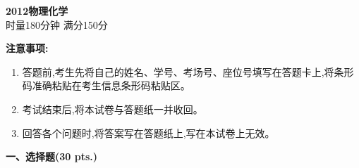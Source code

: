 \begin{center}
    {\LARGE \textbf{2012物理化学}} \\[2ex]
    {\large 时量180分钟 \quad 满分150分}
\end{center}

\vspace{0.5cm}
\noindent\textbf{注意事项:}
\begin{enumerate}[label=\arabic*., parsep=0pt, itemsep=0pt]
    \item 答题前,考生先将自己的姓名、学号、考场号、座位号填写在答题卡上,将条形码准确粘贴在考生信息条形码粘贴区。
    \item 考试结束后,将本试卷与答题纸一并收回。
    \item 回答各个问题时,将答案写在答题纸上,写在本试卷上无效。
\end{enumerate}

\vspace{0.5cm}
\noindent\textbf{一、选择题(30 pts.)}


